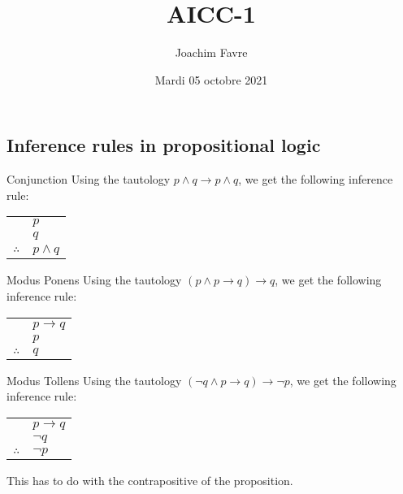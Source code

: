 \documentclass{article}
\title{AICC-1}
\author{Joachim Favre}
\date{Mardi 05 octobre 2021}
\begin{document}
\maketitle



\subsection{Inference rules in propositional logic}
\begin{parag}{Conjunction}
    Using the tautology $p \land q \to p \land q$, we get the following inference rule:
    \begin{center}
    \begin{tabular}{rl}
        & $p$  \\
        & $q$ \\
        \hline
        $\therefore$ & $p \land q$
    \end{tabular}
    \end{center}
\end{parag}

\begin{parag}{Modus Ponens}
    Using the tautology $\left(p \land p \to q\right) \to q$, we get the following inference rule:
    \begin{center}
    \begin{tabular}{rl}
        & $p \to q$ \\
        & $p$  \\
        \hline
        $\therefore$ & $q$
    \end{tabular}
    \end{center}
\end{parag}

\begin{parag}{Modus Tollens}
    Using the tautology $\left(\lnot q \land p \to q\right) \to \lnot p$, we get the following inference rule:
    \begin{center}
    \begin{tabular}{rl}
        & $p \to q$  \\
        & $\lnot q$ \\
        \hline
        $\therefore$ & $\lnot p$
    \end{tabular}
    \end{center}

    This has to do with the contrapositive of the proposition.
\end{parag}
\end{document}
